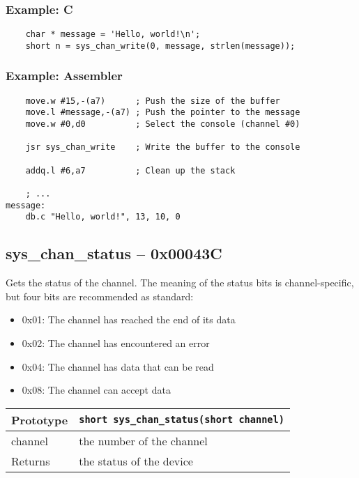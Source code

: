 \subsubsection*{Example: C}
\begin{lstlisting}
    char * message = 'Hello, world!\n';
    short n = sys_chan_write(0, message, strlen(message));
\end{lstlisting}

\subsubsection*{Example: Assembler}
\begin{verbatim}
    move.w #15,-(a7)      ; Push the size of the buffer
    move.l #message,-(a7) ; Push the pointer to the message
    move.w #0,d0          ; Select the console (channel #0)
    
    jsr sys_chan_write    ; Write the buffer to the console

    addq.l #6,a7          ; Clean up the stack
    
    ; ...
message:
    db.c "Hello, world!", 13, 10, 0
\end{verbatim}

\subsection*{sys\_chan\_status -- 0x00043C}
Gets the status of the channel. The meaning of the status bits is channel-specific, but four bits are recommended as standard:

\begin{itemize}
\item 0x01: The channel has reached the end of its data
\item 0x02: The channel has encountered an error
\item 0x04: The channel has data that can be read
\item 0x08: The channel can accept data
\end{itemize}

\bigskip

\begin{tabular}{|l||l|} \hline
Prototype & \lstinline!short sys_chan_status(short channel)! \\ \hline
channel & the number of the channel \\ \hline
Returns & the status of the device \\ \hline
\end{tabular}

